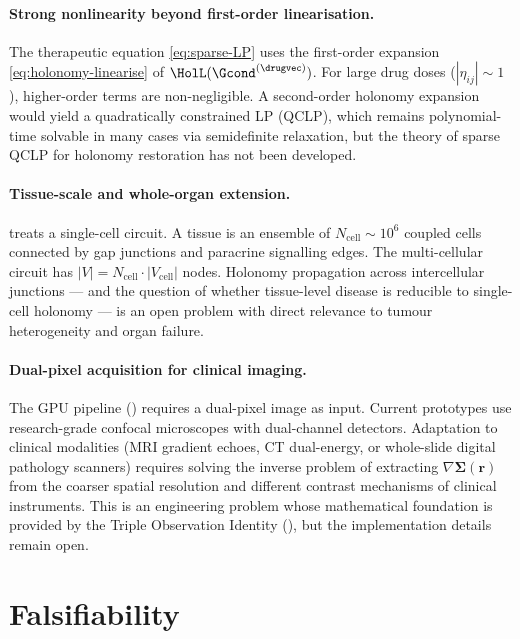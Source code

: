 \paragraph{Strong nonlinearity beyond first-order linearisation.}
The therapeutic equation \eqref{eq:sparse-LP} uses the first-order expansion
\eqref{eq:holonomy-linearise} of $\HolL(\Gcond^{(\drugvec)})$.  For large
drug doses ($|\eta_{ij}| \sim 1$), higher-order terms are non-negligible.
A second-order holonomy expansion would yield a quadratically constrained LP
(QCLP), which remains polynomial-time solvable in many cases via
semidefinite relaxation, but the theory of sparse QCLP for holonomy
restoration has not been developed.

\paragraph{Tissue-scale and whole-organ extension.}
 treats a single-cell circuit.  A tissue is an ensemble
of $N_{\mathrm{cell}} \sim 10^6$ coupled cells connected by gap junctions and
paracrine signalling edges.  The multi-cellular circuit has $|V| = N_{\mathrm{cell}} \cdot |V_{\mathrm{cell}}|$ nodes.  Holonomy propagation across intercellular junctions — and the question of whether tissue-level disease is reducible to single-cell holonomy — is an open problem with direct relevance to tumour heterogeneity and organ failure.

\paragraph{Dual-pixel acquisition for clinical imaging.}
The GPU pipeline () requires a dual-pixel image as input.
Current prototypes use research-grade confocal microscopes with dual-channel
detectors.  Adaptation to clinical modalities (MRI gradient echoes, CT
dual-energy, or whole-slide digital pathology scanners) requires solving the
inverse problem of extracting $\nabla\boldsymbol{\Sigma}(\mathbf{r})$ from the
coarser spatial resolution and different contrast mechanisms of clinical
instruments.  This is an engineering problem whose mathematical foundation is
provided by the Triple Observation Identity (),
but the implementation details remain open.

\section{Falsifiability}
\label{sec:falsifiability}


